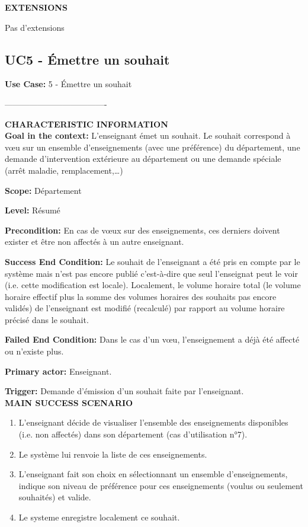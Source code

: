  \noindent\textbf{EXTENSIONS}
 \begin{list}{}{}
 \item Pas d'extensions\\
 \end{list}


 \subsection{UC5 - Émettre un souhait}

 \noindent\textbf{Use Case:} 5 - \'Emettre un souhait

 \noindent\--------------------------------------

 \noindent\textbf{CHARACTERISTIC INFORMATION}\\

 \noindent \textbf{Goal in the context:}
 L'enseignant émet un souhait. Le souhait correspond à v\oe u sur un ensemble d'enseignements (avec une préférence) du département, une demande d'intervention extérieure au département ou une demande spéciale (arrêt maladie, remplacement,\dots)

 \noindent\textbf{Scope:}
 Département

 \noindent\textbf{Level:}
 Résumé

 \noindent\textbf{Precondition:}
 En cas de v\oe ux sur des enseignements, ces derniers doivent exister et être non affectés à un autre enseignant.

 \noindent\textbf{Success End Condition:}
 Le souhait de l'enseignant a été pris en compte par le système mais n'est pas encore publié c'est-à-dire que seul l'enseignat peut le voir (i.e. cette modification est locale). Localement, le volume horaire total (le volume horaire effectif plus la somme des volumes horaires des souhaits pas encore validés) de l'enseignant est modifié (recalculé) par rapport au volume horaire précisé dans le souhait.

 \noindent\textbf{Failed End Condition:}
 Dans le cas d'un v\oe u, l'enseignement a déjà été affecté ou n'existe plus.

 \noindent\textbf{Primary actor:}
 Enseignant.

 \noindent\textbf{Trigger:}
 Demande d'émission d'un souhait faite par l'enseignant.\\

 \noindent\textbf{MAIN SUCCESS SCENARIO}
 \begin{enumerate}
 \item L'enseignant décide de visualiser l'ensemble des enseignements disponibles (i.e. non affectés) dans son département (cas d'utilisation n°7).
 \item Le système lui renvoie la liste de ces enseignements.
 \item L'enseignant fait son choix en sélectionnant un ensemble d'enseignements, indique son niveau de préférence pour ces enseignements (voulus ou seulement souhaités) et valide.
 \item Le systeme enregistre localement ce souhait.\\
 \end{enumerate}


